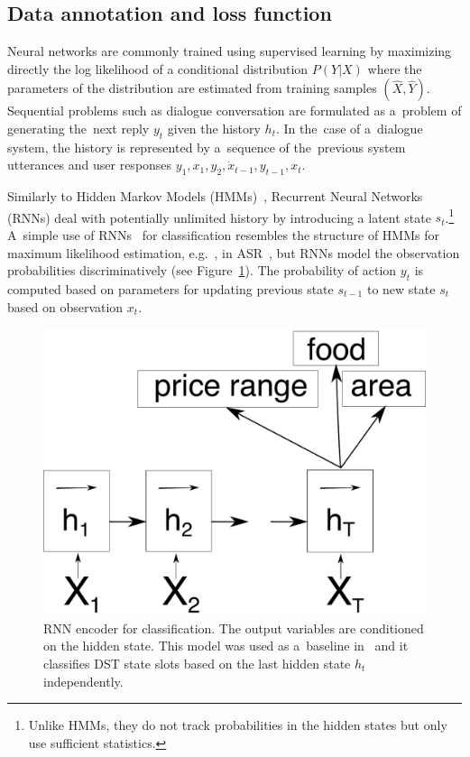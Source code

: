 \documentclass[11pt]{article}
\begin{document}
\subsection{Data annotation and loss function}
\label{sub:data_annotation}

Neural networks are commonly trained using supervised learning by maximizing directly the log likelihood of a conditional distribution $ P(Y| X) $ where the parameters of the distribution are estimated from training samples $ (\hat{X}, \hat{Y}) $.
Sequential problems such as dialogue conversation are formulated as a~problem of generating the~next reply $y_t$ given the history $h_t$.
In the~case of a~dialogue system, the history is represented by a~sequence of the~previous system utterances and user responses $ y_1, x_1, y_2, \dot x_{t-1}, y_{t-1}, x_t $.

Similarly to Hidden Markov Models (HMMs)~\cite{huang_hidden_1990}, Recurrent Neural Networks (RNNs) deal with potentially unlimited history by introducing a latent state $s_t$.\footnote{Unlike HMMs, they do not track probabilities in the hidden states but only use sufficient statistics.}
A~simple use of  RNNs~\cite{gers_learning_2000} for classification resembles the structure of HMMs for maximum likelihood estimation, e.g.\ , in ASR~\cite{huang_hidden_1990}, but RNNs model the observation probabilities discriminatively (see Figure~\ref{fig:encoder}).
The probability of action $ y_t $ is computed based on parameters for updating previous state $s_{t-1}$ to new state $s_t$ based on observation $x_t$.

\begin{figure}[htb]
    \centering
    \includegraphics[width=0.8\linewidth]{encoder}
    \caption{RNN encoder for classification. The output variables are conditioned on the hidden state. 
    This model was used as a~baseline in~\cite{platek_recurrent_2016} and it classifies DST state slots based on the last hidden state $h_t$ independently.}
\label{fig:encoder}
\end{figure}
\end{document}
